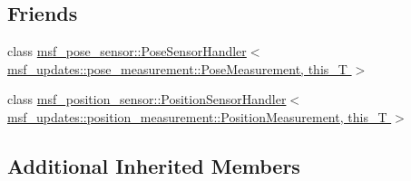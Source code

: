 \subsection*{Friends}
\begin{DoxyCompactItemize}
\item 
class \hyperlink{classmsf__updates_1_1PositionPoseSensorManager_a2711dad8d3f9418018c2de38ce191b26}{msf\-\_\-pose\-\_\-sensor\-::\-Pose\-Sensor\-Handler$<$ msf\-\_\-updates\-::pose\-\_\-measurement\-::\-Pose\-Measurement, this\-\_\-\-T $>$}
\item 
class \hyperlink{classmsf__updates_1_1PositionPoseSensorManager_aa7d57632a83d386e7ce22a249c998b47}{msf\-\_\-position\-\_\-sensor\-::\-Position\-Sensor\-Handler$<$ msf\-\_\-updates\-::position\-\_\-measurement\-::\-Position\-Measurement, this\-\_\-\-T $>$}
\end{DoxyCompactItemize}
\subsection*{Additional Inherited Members}


